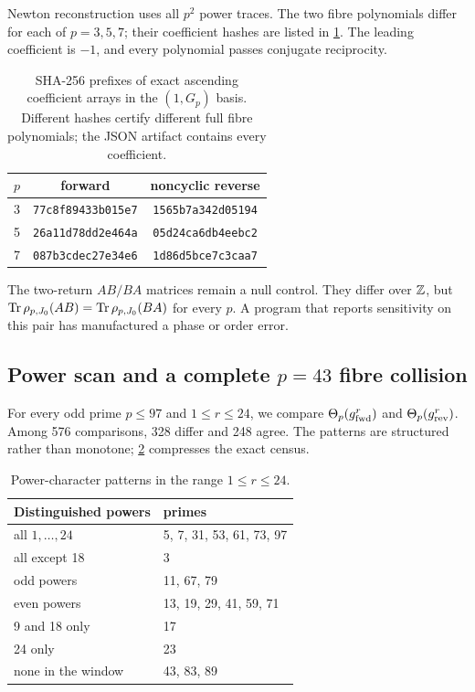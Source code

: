 Newton reconstruction uses all \(p^2\) power traces.  The two fibre
polynomials differ for each of \(p=3,5,7\); their coefficient hashes are
listed in \cref{tab:polyhash}.  The leading coefficient is \(-1\), and every
polynomial passes conjugate reciprocity.

\begin{table}[ht]
\centering
\caption{SHA-256 prefixes of exact ascending coefficient arrays in the
\((1,G_p)\) basis.  Different hashes certify different full fibre
polynomials; the JSON artifact contains every coefficient.}
\label{tab:polyhash}
\begin{tabular}{ccc}
\toprule
\(p\) & forward & noncyclic reverse\\
\midrule
3 & \texttt{77c8f89433b015e7} & \texttt{1565b7a342d05194}\\
5 & \texttt{26a11d78dd2e464a} & \texttt{05d24ca6db4eebc2}\\
7 & \texttt{087b3cdec27e34e6} & \texttt{1d86d5bce7c3caa7}\\
\bottomrule
\end{tabular}
\end{table}

The two-return \(AB/BA\) matrices remain a null control.  They differ over
\(\mathbb{Z}\), but
\(\operatorname{Tr}\rho_{p,J_0}(AB)=\operatorname{Tr}\rho_{p,J_0}(BA)\) for every \(p\).  A program that
reports sensitivity on this pair has manufactured a phase or order error.

\subsection{Power scan and a complete \(p=43\) fibre collision}

For every odd prime \(p\le97\) and \(1\le r\le24\), we compare
\(\Theta_p(g_{\rm fwd}^r)\) and \(\Theta_p(g_{\rm rev}^r)\).  Among 576
comparisons, 328 differ and 248 agree.  The patterns are structured rather
than monotone; \cref{tab:patterns} compresses the exact census.

\begin{table}[ht]
\centering
\caption{Power-character patterns in the range \(1\le r\le24\).}
\label{tab:patterns}
\begin{tabular}{ll}
\toprule
Distinguished powers & primes\\
\midrule
all \(1,\ldots,24\) & 5, 7, 31, 53, 61, 73, 97\\
all except 18 & 3\\
odd powers & 11, 67, 79\\
even powers & 13, 19, 29, 41, 59, 71\\
9 and 18 only & 17\\
24 only & 23\\
none in the window & 43, 83, 89\\
\bottomrule
\end{tabular}
\end{table}

